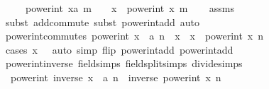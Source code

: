 \begin{isabellebody}
\ \ \ \ \ {\isachardoublequoteopen}power{\isacharunderscore}{\kern0pt}int\ {\isacharparenleft}{\kern0pt}x{\isacharcolon}{\kern0pt}{\isacharcolon}{\kern0pt}{\isacharprime}{\kern0pt}a{\isacharparenright}{\kern0pt}\ {\isacharparenleft}{\kern0pt}m\ {\isacharplus}{\kern0pt}\ {}{\isacharparenright}{\kern0pt}\ {\isacharequal}{\kern0pt}\ x\ {\isacharasterisk}{\kern0pt}\ power{\isacharunderscore}{\kern0pt}int\ x\ m{\isachardoublequoteclose}\isanewline
%
\isadelimproof
\ \ %
\endisadelimproof
%
\isatagproof
{}\isamarkupfalse%
\ assms\ \isamarkupfalse%
\ {\isacharparenleft}{\kern0pt}subst\ add{\isachardot}{\kern0pt}commute{\isacharcomma}{\kern0pt}\ subst\ power{\isacharunderscore}{\kern0pt}int{\isacharunderscore}{\kern0pt}add{\isacharparenright}{\kern0pt}\ auto%
\endisatagproof
{\isafoldproof}%
%
\isadelimproof
\isanewline
%
\endisadelimproof
\isanewline
{}\isamarkupfalse%
\ power{\isacharunderscore}{\kern0pt}int{\isacharunderscore}{\kern0pt}commutes{\isacharcolon}{\kern0pt}\ {\isachardoublequoteopen}power{\isacharunderscore}{\kern0pt}int\ {\isacharparenleft}{\kern0pt}x\ {\isacharcolon}{\kern0pt}{\isacharcolon}{\kern0pt}\ {\isacharprime}{\kern0pt}a{\isacharparenright}{\kern0pt}\ n\ {\isacharasterisk}{\kern0pt}\ x\ {\isacharequal}{\kern0pt}\ x\ {\isacharasterisk}{\kern0pt}\ power{\isacharunderscore}{\kern0pt}int\ x\ n{\isachardoublequoteclose}\isanewline
%
\isadelimproof
\ \ %
\endisadelimproof
%
\isatagproof
{}\isamarkupfalse%
\ {\isacharparenleft}{\kern0pt}cases\ {\isachardoublequoteopen}x\ {\isacharequal}{\kern0pt}\ {}{\isachardoublequoteclose}{\isacharparenright}{\kern0pt}\ {\isacharparenleft}{\kern0pt}auto\ simp\ flip{\isacharcolon}{\kern0pt}\ power{\isacharunderscore}{\kern0pt}int{\isacharunderscore}{\kern0pt}add{\isacharunderscore}{\kern0pt}{}\ power{\isacharunderscore}{\kern0pt}int{\isacharunderscore}{\kern0pt}add{\isacharunderscore}{\kern0pt}{}{\isacharprime}{\kern0pt}{\isacharparenright}{\kern0pt}%
\endisatagproof
{\isafoldproof}%
%
\isadelimproof
\isanewline
%
\endisadelimproof
\isanewline
{}\isamarkupfalse%
\ power{\isacharunderscore}{\kern0pt}int{\isacharunderscore}{\kern0pt}inverse\ {\isacharbrackleft}{\kern0pt}field{\isacharunderscore}{\kern0pt}simps{\isacharcomma}{\kern0pt}\ field{\isacharunderscore}{\kern0pt}split{\isacharunderscore}{\kern0pt}simps{\isacharcomma}{\kern0pt}\ divide{\isacharunderscore}{\kern0pt}simps{\isacharbrackright}{\kern0pt}{\isacharcolon}{\kern0pt}\isanewline
\ \ {\isachardoublequoteopen}power{\isacharunderscore}{\kern0pt}int\ {\isacharparenleft}{\kern0pt}inverse\ {\isacharparenleft}{\kern0pt}x\ {\isacharcolon}{\kern0pt}{\isacharcolon}{\kern0pt}\ {\isacharprime}{\kern0pt}a{\isacharparenright}{\kern0pt}{\isacharparenright}{\kern0pt}\ n\ {\isacharequal}{\kern0pt}\ inverse\ {\isacharparenleft}{\kern0pt}power{\isacharunderscore}{\kern0pt}int\ x\ n{\isacharparenright}{\kern0pt}{\isachardoublequoteclose}\isanewline

\end{isabellebody}
